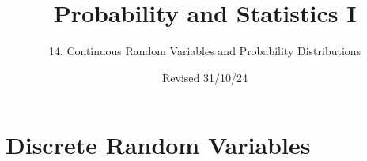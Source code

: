 

\newcommand{\lecturenum}{14}

\title[SS2857]{Probability and Statistics I}
\subtitle{\lecturenum. Continuous Random Variables and Probability Distributions}

\date{Revised 31/10/24}






{

\begin{frame}
  \addtocounter{framenumber}{-1}

  \maketitle
\end{frame}
}

\section{Discrete Random Variables}

%




  

